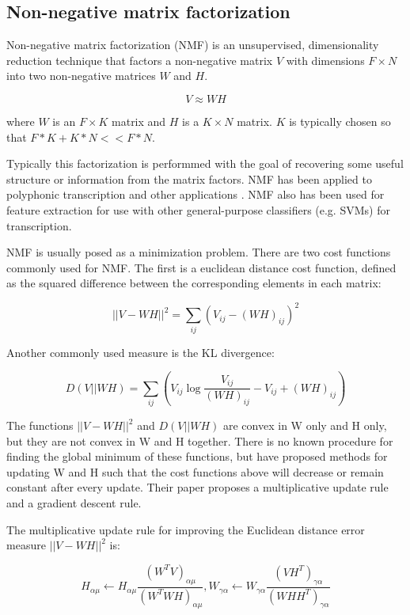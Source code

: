 \documentclass[5p]{elsarticle}
\begin{document}
\subsection{Non-negative matrix factorization}

Non-negative matrix factorization (NMF) is an unsupervised, dimensionality reduction technique that factors a non-negative matrix $V$ with dimensions $F \times N$ into two non-negative matrices $W$ and $H$.

\[ V \approx WH \]

\noindent where $W$ is an $F \times K$ matrix and $H$ is a $K \times N$ matrix. $K$ is typically chosen so that $F*K + K*N << F*N$. 

Typically this factorization is performmed with the goal of recovering some useful structure or information from the matrix factors. NMF has been applied to polyphonic transcription and other applications \cite{smaragdis2003non}. NMF also has been used for feature extraction for use with other general-purpose classifiers (e.g. SVMs) for transcription.

NMF is usually posed as a minimization problem. There are two cost functions commonly used for NMF. The first is a euclidean distance cost function, defined as the squared difference between the corresponding elements in each matrix:

\[ \displaystyle ||V-WH||^{2} = \sum_{ij} (V_{ij} - (WH)_{ij})^{2} \]

\noindent Another commonly used measure is the KL divergence:

\[ \displaystyle D(V||WH) = \sum_{ij} (V_{ij} \log \frac{V_{ij}}{(WH)_{ij}} - V_{ij} + (WH)_{ij}) \]


The functions $||V-WH||^{2}$ and $D(V||WH)$ are convex in W only and H only, but they are not convex in W and H together. There is no known procedure for finding the global minimum of these functions, but \citet{seung2001algorithms} have proposed methods for updating W and H such that the cost functions above will decrease or remain constant after every update. Their paper proposes a multiplicative update rule and a gradient descent rule.

The multiplicative update rule for improving the Euclidean distance error measure $||V-WH||^{2}$ is:

\[ H_{\alpha \mu} \leftarrow H_{\alpha \mu} \frac{ (W^{T} V)_{\alpha \mu}}{(W^{T} W H )_{\alpha \mu}}, W_{\gamma \alpha} \leftarrow W_{\gamma \alpha} \frac{ (V H^{T})_{\gamma \alpha}} {(W H H^{T})_{\gamma \alpha}} \]
\end{document}
